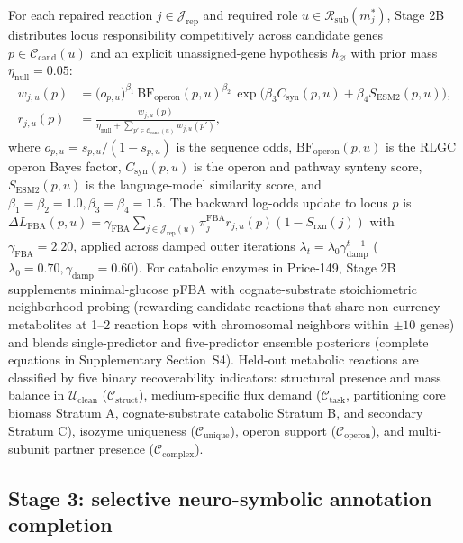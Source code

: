 \documentclass[10pt,twocolumn]{article}
\begin{document}
For each repaired reaction $j \in \mathcal{J}_{\text{rep}}$ and required role $u \in \mathcal{R}_{\text{sub}}(m_j^*)$, Stage 2B distributes locus responsibility competitively across candidate genes $p \in \mathcal{C}_{\text{cand}}(u)$ and an explicit unassigned-gene hypothesis $h_\varnothing$ with prior mass $\eta_{\text{null}} = 0.05$:
\begin{align}
  w_{j, u}(p) &= \bigl(o_{p, u}\bigr)^{\beta_1} \, \text{BF}_{\text{operon}}(p, u)^{\beta_2} \, \exp\bigl(\beta_3 C_{\text{syn}}(p, u) + \beta_4 S_{\text{ESM2}}(p, u)\bigr), \nonumber \\
  r_{j, u}(p) &= \frac{w_{j, u}(p)}{\eta_{\text{null}} + \sum_{p' \in \mathcal{C}_{\text{cand}}(u)} w_{j, u}(p')},
  \label{eq:responsibility}
\end{align}
where $o_{p, u} = s_{p, u}/(1 - s_{p, u})$ is the sequence odds, $\text{BF}_{\text{operon}}(p, u)$ is the RLGC operon Bayes factor, $C_{\text{syn}}(p, u)$ is the operon and pathway synteny score, $S_{\text{ESM2}}(p, u)$ is the language-model similarity score, and $\beta_1 = \beta_2 = 1.0, \beta_3 = \beta_4 = 1.5$. The backward log-odds update to locus $p$ is $\Delta L_{\text{FBA}}(p, u) = \gamma_{\text{FBA}} \sum_{j \in \mathcal{J}_{\text{rep}}(u)} \pi_j^{\text{FBA}} r_{j, u}(p) (1 - S_{\text{rxn}}(j))$ with $\gamma_{\text{FBA}} = 2.20$, applied across damped outer iterations $\lambda_t = \lambda_0 \gamma_{\text{damp}}^{t-1}$ ($\lambda_0 = 0.70, \gamma_{\text{damp}} = 0.60$). For catabolic enzymes in Price-149, Stage 2B supplements minimal-glucose pFBA with cognate-substrate stoichiometric neighborhood probing (rewarding candidate reactions that share non-currency metabolites at 1--2 reaction hops with chromosomal neighbors within $\pm 10$ genes) and blends single-predictor and five-predictor ensemble posteriors (complete equations in Supplementary Section~S4). Held-out metabolic reactions are classified by five binary recoverability indicators: structural presence and mass balance in $\mathcal{U}_{\text{clean}}$ ($\mathcal{C}_{\text{struct}}$), medium-specific flux demand ($\mathcal{C}_{\text{task}}$, partitioning core biomass Stratum A, cognate-substrate catabolic Stratum B, and secondary Stratum C), isozyme uniqueness ($\mathcal{C}_{\text{unique}}$), operon support ($\mathcal{C}_{\text{operon}}$), and multi-subunit partner presence ($\mathcal{C}_{\text{complex}}$).

\subsection{Stage 3: selective neuro-symbolic annotation completion}
\end{document}
